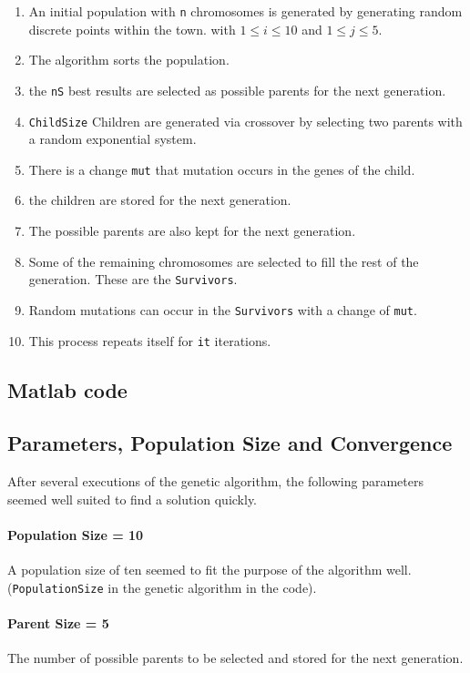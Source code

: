 \documentclass[10pt,a4paper]{article}
\begin{document}
\begin{enumerate}
\item An initial population with \texttt{n} chromosomes is generated by generating random discrete points within the town. with $ 1 \leq i \leq 10$ and $ 1 \leq j \leq 5$.
\item The  algorithm sorts the  population.
\item the \texttt{nS} best results are selected as possible parents for the next generation.
\item \texttt{ChildSize} Children are generated via crossover by selecting two parents with a random exponential system.
\item There is a change \texttt{mut} that mutation occurs in the genes of the child.
\item the children are stored for the next generation.
\item The possible parents are also kept for the next generation.
\item Some of the remaining chromosomes are selected to fill the rest of the generation. These are the \texttt{Survivors}.
\item Random mutations can occur in the \texttt{Survivors} with a change of \texttt{mut}.
\item This process repeats itself for \texttt{it} iterations.
\end{enumerate}

\subsection{Matlab code}


\subsection{Parameters, Population Size and Convergence}
After several executions of the genetic algorithm, the following parameters seemed well suited to find a solution quickly.

\paragraph{Population Size = 10} A population size of ten seemed to fit the purpose of the algorithm well. (\texttt{PopulationSize} in the genetic algorithm in the code).
\paragraph{Parent Size = 5} The number of possible parents to be selected and stored for the next generation.
\end{document}
